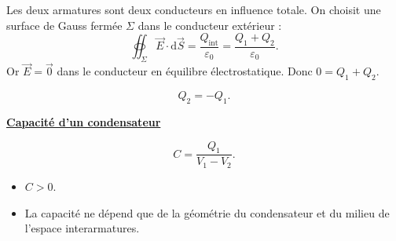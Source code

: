 \documentclass[11pt,a4paper]{article}
\newif\ifinexample
\newcommand{\dd}{\mathrm d}
\newcommand{\titr}[1]{\par\ifinexample\else\Needspace{4\baselineskip}\fi\textbf{\underline{#1}}\par\nopagebreak[3]}
\newcommand{\eps}{\varepsilon_0}\newcommand{\E}{\vec E}\newcommand{\dS}{\dd\vec S}\newcommand{\dM}{\dd\vec M}
\begin{document}
Les deux armatures sont deux conducteurs en influence totale. On choisit une surface de Gauss fermée $\Sigma$ dans le conducteur extérieur :
\[\oiint_\Sigma\E\cdot\dS=\frac{Q_{\mathrm{int}}}{\eps}=\frac{Q_1+Q_2}{\eps}.\]
Or $\E=\vec0$ dans le conducteur en équilibre électrostatique. Donc $0=Q_1+Q_2$.
\begin{cadre}\[Q_2=-Q_1.\]\end{cadre}
\titr{Capacité d'un condensateur}
\begin{cadre}\[C=\frac{Q_1}{V_1-V_2}.\]\end{cadre}
\begin{itemize}\item $C>0$.\item La capacité ne dépend que de la géométrie du condensateur et du milieu de l'espace interarmatures.\end{itemize}
\end{document}
